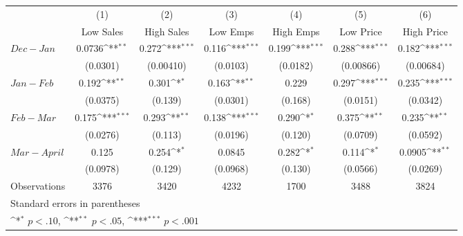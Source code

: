 {
\def\sym#1{\ifmmode^{#1}\else\(^{#1}\)\fi}
\begin{tabular}{l*{6}{c}}
\hline\hline
                    &\multicolumn{1}{c}{(1)}&\multicolumn{1}{c}{(2)}&\multicolumn{1}{c}{(3)}&\multicolumn{1}{c}{(4)}&\multicolumn{1}{c}{(5)}&\multicolumn{1}{c}{(6)}\\
                    &\multicolumn{1}{c}{Low Sales}&\multicolumn{1}{c}{High Sales}&\multicolumn{1}{c}{Low Emps}&\multicolumn{1}{c}{High Emps}&\multicolumn{1}{c}{Low Price}&\multicolumn{1}{c}{High Price}\\
\hline
$ Dec-Jan $         &      0.0736\sym{**} &       0.272\sym{***}&       0.116\sym{***}&       0.199\sym{***}&       0.288\sym{***}&       0.182\sym{***}\\
                    &    (0.0301)         &   (0.00410)         &    (0.0103)         &    (0.0182)         &   (0.00866)         &   (0.00684)         \\
[1em]
 $ Jan-Feb $        &       0.192\sym{**} &       0.301\sym{*}  &       0.163\sym{**} &       0.229         &       0.297\sym{***}&       0.235\sym{***}\\
                    &    (0.0375)         &     (0.139)         &    (0.0301)         &     (0.168)         &    (0.0151)         &    (0.0342)         \\
[1em]
 $ Feb-Mar $        &       0.175\sym{***}&       0.293\sym{**} &       0.138\sym{***}&       0.290\sym{*}  &       0.375\sym{**} &       0.235\sym{**} \\
                    &    (0.0276)         &     (0.113)         &    (0.0196)         &     (0.120)         &    (0.0709)         &    (0.0592)         \\
[1em]
 $ Mar-April $      &       0.125         &       0.254\sym{*}  &      0.0845         &       0.282\sym{*}  &       0.114\sym{*}  &      0.0905\sym{**} \\
                    &    (0.0978)         &     (0.129)         &    (0.0968)         &     (0.130)         &    (0.0566)         &    (0.0269)         \\
\hline
Observations        &        3376         &        3420         &        4232         &        1700         &        3488         &        3824         \\
\hline\hline
\multicolumn{7}{l}{\footnotesize Standard errors in parentheses}\\
\multicolumn{7}{l}{\footnotesize \sym{*} \(p<.10\), \sym{**} \(p<.05\), \sym{***} \(p<.001\)}\\
\end{tabular}
}
